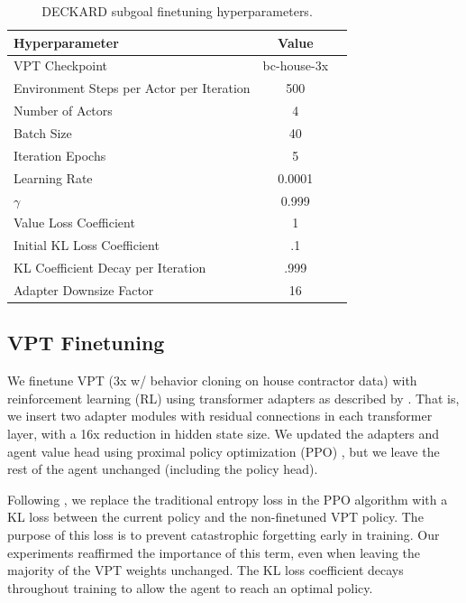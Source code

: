 \documentclass[nohyperref]{article}
\theoremstyle{plain}
\theoremstyle{definition}
\theoremstyle{remark}
\newcommand{\agentshort}{\textsc{DECKARD}}
\begin{document}
\begin{table}[h]
    \small
    \setlength{\tabcolsep}{2.75pt}
    \center
    \begin{tabular}{lcc}
        Hyperparameter & Value \\
        \midrule
        VPT Checkpoint & bc-house-3x \\
        Environment Steps per Actor per Iteration & 500  \\
        Number of Actors & 4  \\
        Batch Size & 40 \\
        Iteration Epochs & 5 \\
        Learning Rate & 0.0001 \\
        $\gamma$ & 0.999 \\
        Value Loss Coefficient & 1 \\
        Initial KL Loss Coefficient & .1 \\
        KL Coefficient Decay per Iteration & .999 \\
        Adapter Downsize Factor & 16
    \end{tabular}
    \caption{
    \agentshort{} subgoal finetuning hyperparameters.
    }
    \label{tab:hyper}
\end{table}

\subsection{VPT Finetuning}

We finetune VPT (3x w/ behavior cloning on house contractor data) \cite{bakervideo} with reinforcement learning (RL) using transformer adapters as described by \citet{houlsby2019parameter}.
That is, we insert two adapter modules with residual connections in each transformer layer, with a 16x reduction in hidden state size.
We updated the adapters and agent value head using proximal policy optimization (PPO) \cite{schulman2017proximal}, but we leave the rest of the agent unchanged (including the policy head).

Following \citet{bakervideo}, we replace the traditional entropy loss in the PPO algorithm with a KL loss between the current policy and the non-finetuned VPT policy.
The purpose of this loss is to prevent catastrophic forgetting early in training.
Our experiments reaffirmed the importance of this term, even when leaving the majority of the VPT weights unchanged.
The KL loss coefficient decays throughout training to allow the agent to reach an optimal policy.
\end{document}
